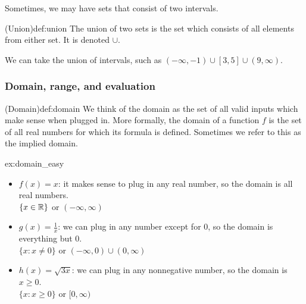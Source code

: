 \documentclass{article}
\begin{document}
Sometimes, we may have sets that consist of two intervals.

\begin{definition}{(Union)}{def:union}
    The union of two sets is the set which consists of all elements from either set. It is denoted $\cup$.

    We can take the union of intervals, such as $(-\infty,-1)\cup[3,5]\cup(9,\infty)$.
\end{definition}

\subsubsection{Domain, range, and evaluation}

\begin{definition}{(Domain)}{def:domain}
    We think of the domain as the set of all valid inputs which make sense when plugged in. More formally, the domain of a function $f$ is the set of all real numbers for which its formula is defined. Sometimes we refer to this as the implied domain.
\end{definition}
\begin{example}{}{ex:domain_easy}
    \begin{itemize}
        \item $f(x)=x$: it makes sense to plug in any real number, so the domain is all real numbers.\\$\{x\in \mathbb{R}\}$ or $(-\infty,\infty)$
        \item $g(x)=\frac{1}{x}$: we can plug in any number except for 0, so the domain is everything but 0.\\$\{x:x\neq 0\}$ or $(-\infty,0)\cup(0,\infty)$
        \item $h(x)=\sqrt{3x}$: we can plug in any nonnegative number, so the domain is $x\geq 0$.\\$\{x:x\geq 0\}$ or $[0,\infty)$
    \end{itemize}
\end{example}
\end{document}
